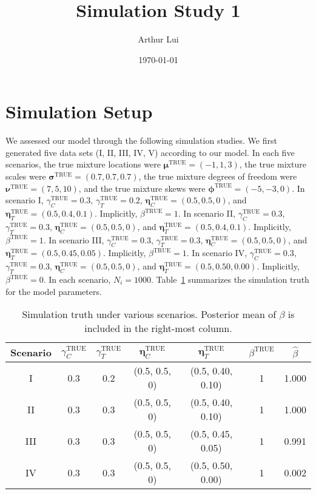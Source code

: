 \documentclass[12pt]{article} %
\title{Simulation Study 1}
\author{Arthur Lui}
\date{\today} %
\newcommand{\true}{\text{TRUE}}
\begin{document}
\maketitle

\section{Simulation Setup}\label{sec:sim-setup}
We assessed our model through the following simulation studies. We first
generated five data sets (I, II, III, IV, V) according to our model. In each
five scenarios,
%
the true mixture locations were $\bm{\mu}^\true=(-1, 1, 3)$,
the true mixture scales were $\bm{\sigma}^\true=(0.7, 0.7, 0.7)$,
the true mixture degrees of freedom were $\bm{\nu}^\true=(7, 5, 10)$, and
the true mixture skews were $\bm{\phi}^\true=(-5, -3, 0)$.
%
In scenario I, $\gamma_C^\true=0.3$, $\gamma_T^\true=0.2$, $\bm\eta_C^\true=(0.5,
0.5, 0)$, and $\bm\eta_T^\true=(0.5,0.4,0.1)$. Implicitly, $\beta^\true=1$.
In scenario II, $\gamma_C^\true=0.3$, $\gamma_T^\true=0.3$, $\bm\eta_C^\true=(0.5,
0.5, 0)$, and $\bm\eta_T^\true=(0.5,0.4,0.1)$. Implicitly, $\beta^\true=1$.
In scenario III, $\gamma_C^\true=0.3$, $\gamma_T^\true=0.3$, $\bm\eta_C^\true=(0.5,
0.5, 0)$, and $\bm\eta_T^\true=(0.5,0.45,0.05)$. Implicitly, $\beta^\true=1$.
In scenario IV, $\gamma_C^\true=0.3$, $\gamma_T^\true=0.3$, $\bm\eta_C^\true=(0.5,
0.5, 0)$, and $\bm\eta_T^\true=(0.5,0.50,0.00)$. Implicitly, $\beta^\true=0$.
%
In each scenario, $N_i=1000$. Table~\ref{tab:sim-truth} summarizes the
simulation truth for the model parameters.
\begin{table}
  \centering
  \begin{tabular}{|c|cccccc|}
    \hline 
    Scenario & $\gamma_C^\true$ & $\gamma_T^\true$ & $\bm\eta_C^\true$ & 
    $\bm\eta_T^\true$ & $\beta^\true$ & $\hat\beta$ \\
    \hline 
    I   & 0.3 & 0.2 & (0.5, 0.5, 0) & (0.5, 0.40, 0.10) & 1 & 1.000 \\
    II  & 0.3 & 0.3 & (0.5, 0.5, 0) & (0.5, 0.40, 0.10) & 1 & 1.000 \\
    III & 0.3 & 0.3 & (0.5, 0.5, 0) & (0.5, 0.45, 0.05) & 1 & 0.991 \\
    IV  & 0.3 & 0.3 & (0.5, 0.5, 0) & (0.5, 0.50, 0.00) & 1 & 0.002 \\
    \hline
  \end{tabular}
  \caption{Simulation truth under various scenarios. Posterior mean of
  $\beta$ is included in the right-most column.}
  \label{tab:sim-truth}
\end{table}
\end{document}
